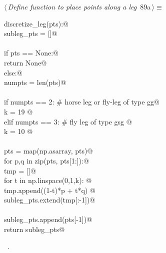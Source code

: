 \documentclass[11.5pt]{report}
\begin{document}
\begin{flushleft} \small
\begin{minipage}{\linewidth}\label{scrap140}\raggedright\small
{} $\langle\,${\itshape Define function to place points along a leg}\nobreak\ {\footnotesize {89a}}$\,\rangle\equiv$
\vspace{-1ex}
\begin{list}{}{} \item
\mbox{}\verb@def discretize_leg(pts):@\\
\mbox{}\verb@   subleg_pts = []@\\
\mbox{}\verb@@\\
\mbox{}\verb@   if pts == None:@\\
\mbox{}\verb@      return None@\\
\mbox{}\verb@   else:@\\
\mbox{}\verb@      numpts = len(pts)@\\
\mbox{}\verb@@\\
\mbox{}\verb@      if numpts == 2:   # horse leg or fly-leg of type gg@\\
\mbox{}\verb@           k  = 19 @\\
\mbox{}\verb@      elif numpts == 3: # fly leg of type gsg @\\
\mbox{}\verb@           k  = 10 @\\
\mbox{}\verb@@\\
\mbox{}\verb@      pts = map(np.asarray, pts)@\\
\mbox{}\verb@      for p,q in zip(pts, pts[1:]):@\\
\mbox{}\verb@          tmp = []@\\
\mbox{}\verb@          for t in np.linspace(0,1,k): @\\
\mbox{}\verb@              tmp.append((1-t)*p + t*q) @\\
\mbox{}\verb@          subleg_pts.extend(tmp[:-1])@\\
\mbox{}\verb@@\\
\mbox{}\verb@      subleg_pts.append(pts[-1])@\\
\mbox{}\verb@      return subleg_pts@\\
\mbox{}\verb@@{\NWsep}
\end{list}
\vspace{-1.5ex}
\footnotesize
\begin{list}{}{\setlength{\itemsep}{-\parsep}\setlength{\itemindent}{-\leftmargin}}
\item \NWtxtMacroRefIn\ .

\item{}
\end{list}
\end{minipage}\vspace{4ex}
\end{flushleft}
\end{document}
